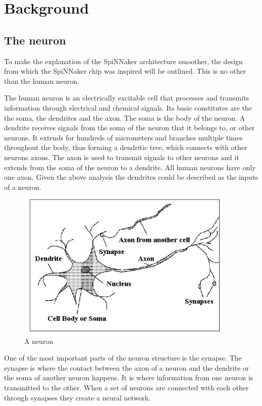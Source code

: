 \documentclass[12pt,a4paper]{article}
\begin{document}
\section{Background}
\subsection{The neuron}
To make the explanation of the SpiNNaker architecture smoother, the design from which the SpiNNaker chip was inspired will be outlined. This is no other than the human neuron.

The human neuron is an electrically excitable cell that processes and transmits information through electrical and chemical signals. Its basic constitutes are the the soma, the dendrites and the axon. The soma is the body of the neuron. A dendrite receives signals from the soma of the neuron that it belongs to, or other neurons. It extends for hundreds of micrometers and branches multiple times throughout the body, thus forming a dendritic tree, which connects with other neurons axons. The axon is used to transmit signals to other neurons and it extends from the soma of the neuron to a dendrite. All human neurons have only one axon. Given the above analysis the dendrites could be described as the inputs of a neuron.
\\[0.5cm]
\begin{figure}[h!]
\includegraphics[width=300pt,height=200pt,scale=2]{Pics/neuron.jpg}
\centering
\caption{A neuron}
\end{figure}

One of the most important parts of the neuron structure is the synapse. The synapse is where the contact between the axon of a neuron and the dendrite or the soma of another neuron happens. It is where information from one neuron is transmitted to the other. When a set of neurons are connected with each other through synapses they create a neural network.
\end{document}
